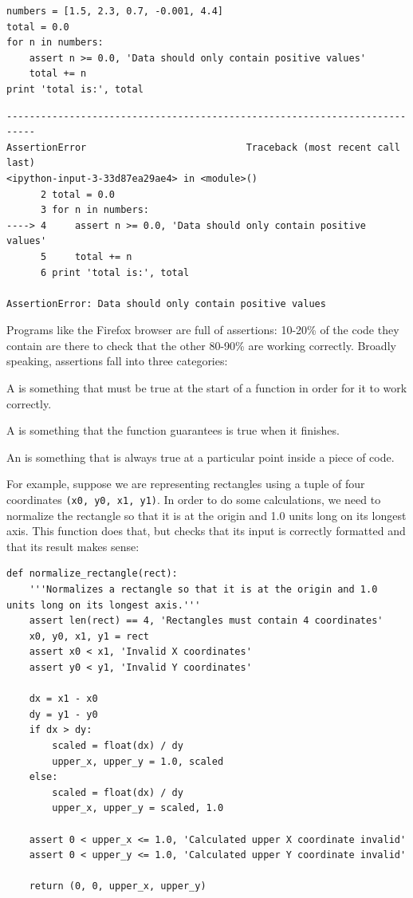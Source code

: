\documentclass{book}
\begin{document}
\begin{verbatim}
numbers = [1.5, 2.3, 0.7, -0.001, 4.4]
total = 0.0
for n in numbers:
    assert n >= 0.0, 'Data should only contain positive values'
    total += n
print 'total is:', total
\end{verbatim}

\begin{verbatim}
---------------------------------------------------------------------------
AssertionError                            Traceback (most recent call last)
<ipython-input-3-33d87ea29ae4> in <module>()
      2 total = 0.0
      3 for n in numbers:
----> 4     assert n >= 0.0, 'Data should only contain positive values'
      5     total += n
      6 print 'total is:', total

AssertionError: Data should only contain positive values
\end{verbatim}

Programs like the Firefox browser are full of assertions: 10-20\% of the
code they contain are there to check that the other 80-90\% are working
correctly. Broadly speaking, assertions fall into three categories:

\begin{swcitemize}
\item
  A  is something that must be
  true at the start of a function in order for it to work correctly.
\item
  A  is something that the
  function guarantees is true when it finishes.
\item
  An  is something that is always true
  at a particular point inside a piece of code.
\end{swcitemize}

For example, suppose we are representing rectangles using a tuple of
four coordinates \texttt{(x0, y0, x1, y1)}. In order to do some
calculations, we need to normalize the rectangle so that it is at the
origin and 1.0 units long on its longest axis. This function does that,
but checks that its input is correctly formatted and that its result
makes sense:

\begin{verbatim}
def normalize_rectangle(rect):
    '''Normalizes a rectangle so that it is at the origin and 1.0 units long on its longest axis.'''
    assert len(rect) == 4, 'Rectangles must contain 4 coordinates'
    x0, y0, x1, y1 = rect
    assert x0 < x1, 'Invalid X coordinates'
    assert y0 < y1, 'Invalid Y coordinates'

    dx = x1 - x0
    dy = y1 - y0
    if dx > dy:
        scaled = float(dx) / dy
        upper_x, upper_y = 1.0, scaled
    else:
        scaled = float(dx) / dy
        upper_x, upper_y = scaled, 1.0

    assert 0 < upper_x <= 1.0, 'Calculated upper X coordinate invalid'
    assert 0 < upper_y <= 1.0, 'Calculated upper Y coordinate invalid'

    return (0, 0, upper_x, upper_y)
\end{verbatim}
\end{document}
